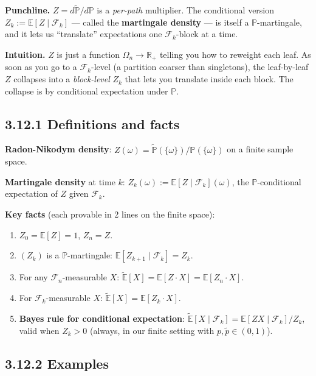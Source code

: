 \documentclass[
  10pt,
  twoside]{book}
\providecommand{\tightlist}{%
  \setlength{\itemsep}{0pt}\setlength{\parskip}{0pt}}
\begin{document}
\textbf{Punchline.} \(Z = d\tilde{\mathbb P}/d\mathbb P\) is a
\emph{per-path} multiplier. The conditional version
\(Z_k := \mathbb E[Z \mid \mathcal F_k]\) --- called the
\textbf{martingale density} --- is itself a \(\mathbb P\)-martingale,
and it lets us ``translate'' expectations one \(\mathcal F_k\)-block at
a time.

\textbf{Intuition.} \(Z\) is just a function
\(\Omega_n \to \mathbb R_+\) telling you how to reweight each leaf. As
soon as you go to a \(\mathcal F_k\)-level (a partition coarser than
singletons), the leaf-by-leaf \(Z\) collapses into a \emph{block-level}
\(Z_k\) that lets you translate inside each block. The collapse is by
conditional expectation under \(\mathbb P\).

\subsection{3.12.1 Definitions and facts}\label{definitions-and-facts-2}

\textbf{Radon-Nikodym density}:
\(Z(\omega) = \tilde{\mathbb P}(\{\omega\})/\mathbb P(\{\omega\})\) on a
finite sample space.

\textbf{Martingale density} at time \(k\):
\(Z_k(\omega) := \mathbb E[Z \mid \mathcal F_k](\omega)\), the
\(\mathbb P\)-conditional expectation of \(Z\) given \(\mathcal F_k\).

\textbf{Key facts} (each provable in 2 lines on the finite space):

\begin{enumerate}
\def\labelenumi{\arabic{enumi}.}
\tightlist
\item
  \(Z_0 = \mathbb E[Z] = 1\), \(Z_n = Z\).
\item
  \((Z_k)\) is a \(\mathbb P\)-martingale:
  \(\mathbb E[Z_{k+1} \mid \mathcal F_k] = Z_k\).
\item
  For any \(\mathcal F_n\)-measurable \(X\):
  \(\tilde{\mathbb E}[X] = \mathbb E[Z\cdot X] = \mathbb E[Z_n\cdot X]\).
\item
  For \(\mathcal F_k\)-measurable \(X\):
  \(\tilde{\mathbb E}[X] = \mathbb E[Z_k \cdot X]\).
\item
  \textbf{Bayes rule for conditional expectation}:
  \(\tilde{\mathbb E}[X \mid \mathcal F_k] = \mathbb E[Z X \mid \mathcal F_k] / Z_k\),
  valid when \(Z_k > 0\) (always, in our finite setting with
  \(p, \tilde p \in (0,1)\)).
\end{enumerate}

\subsection{3.12.2 Examples}\label{examples-22}
\end{document}
